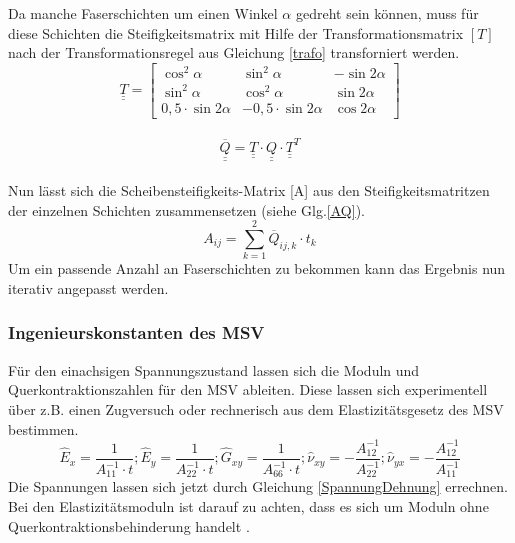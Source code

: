 \noindent
Da manche Faserschichten um einen Winkel $\alpha$ gedreht sein können, muss für diese Schichten die Steifigkeitsmatrix mit Hilfe der Transformationsmatrix $[T]$  nach der Transformationsregel aus Gleichung \ref{trafo} transforniert werden.
\begin{equation}
	\underline{\underline{T}}=
	\begin{bmatrix}
		\cos^{2}\alpha&\sin^{2}\alpha&-\sin 2\alpha\\
		\sin^{2}\alpha&\cos^{2}\alpha&\sin 2\alpha\\
		0,5\cdot \sin2\alpha&-0,5\cdot\sin2\alpha&\cos 2\alpha
	\end{bmatrix}
\end{equation}\\
\begin{equation}
\label{trafo}
	\overline{\underline{\underline{Q}}}=\underline{\underline{T}}\cdot \underline{\underline{Q}} \cdot \underline{\underline{T}}^{T}  
\end{equation}\\
\noindent
Nun lässt sich die Scheibensteifigkeits-Matrix [A] aus den Steifigkeitsmatritzen der einzelnen Schichten zusammensetzen (siehe Glg.\ref{AQ}).
\begin{equation}
\label{AQ}
	A_{ij}= \sum_{k=1}^{2} \overline{Q}_{ij,k}\cdot t_{k}
\end{equation}
\noindent
Um ein passende Anzahl an Faserschichten zu bekommen kann das Ergebnis nun iterativ angepasst werden.\cite{item3}
\subsubsection{Ingenieurskonstanten des MSV}
Für den einachsigen Spannungszustand lassen sich die Moduln und Querkontraktionszahlen für den MSV ableiten.
Diese lassen sich experimentell über z.B. einen Zugversuch oder rechnerisch aus dem Elastizitätsgesetz des MSV bestimmen.
\begin{equation}
\hat{E}_{x}=\frac{1}{A_{11}^{-1}\cdot t}
;
\hat{E}_{y}=\frac{1}{A_{22}^{-1}\cdot t}
;
\hat{G}_{xy}=\frac{1}{A_{66}^{-1}\cdot t}
;
\hat{\nu}_{xy}=-\frac{A_{12}^{-1}}{A_{22}^{-1}}
;
\hat{\nu}_{yx}=-\frac{A_{12}^{-1}}{A_{11}^{-1}}
\end{equation}
\noindent
Die Spannungen lassen sich jetzt durch Gleichung \ref{SpannungDehnung} errechnen.\\
\noindent
Bei den Elastizitätsmoduln ist darauf zu achten, dass es sich um Moduln ohne Querkontraktionsbehinderung handelt \cite{item3}.
